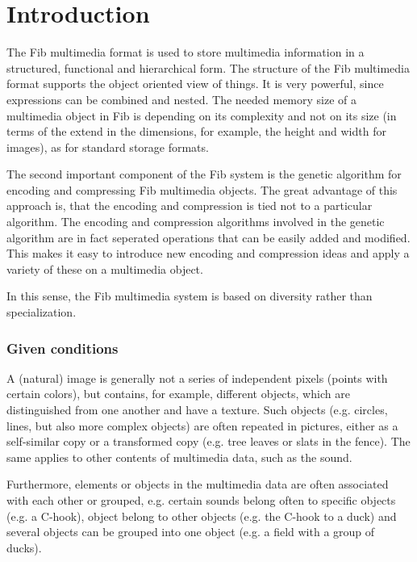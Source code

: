 \documentclass[11pt,a4paper]{article}
\begin{document}
\tableofcontents

\clearpage
{}

\part{Introduction}

The Fib multimedia format is used to store multimedia information in a structured, functional and hierarchical form. The structure of the Fib multimedia format supports the object oriented view of things. It is very powerful, since expressions can be combined and nested. The needed memory size of a multimedia object in Fib is depending on its complexity and not on its size (in terms of the extend in the dimensions, for example, the height and width for images), as for standard storage formats.

The second important component of the Fib system is the genetic algorithm for encoding and compressing Fib multimedia objects. The great advantage of this approach is, that the encoding and compression is tied not to a particular algorithm. The encoding and compression algorithms involved in the genetic algorithm are in fact seperated operations that can be easily added and modified. This makes it easy to introduce new encoding and compression ideas and apply a variety of these on a multimedia object.

In this sense, the Fib multimedia system is based on diversity rather than specialization.


\section{Given conditions}

A (natural) image is generally not a series of independent pixels (points with certain colors), but contains, for example, different objects, which are distinguished from one another and have a texture. Such objects (e.g. circles, lines, but also more complex objects) are often repeated in pictures, either as a self-similar copy or a transformed copy (e.g. tree leaves or slats in the fence). The same applies to other contents of multimedia data, such as the sound.

Furthermore, elements or objects in the multimedia data are often associated with each other or grouped, e.g. certain sounds belong often to specific objects (e.g. a C-hook), object belong to other objects (e.g. the C-hook to a duck) and several objects can be grouped into one object (e.g. a field with a group of ducks).
\end{document}
